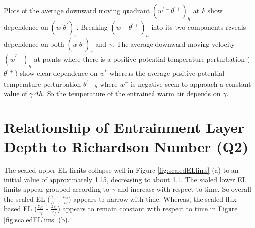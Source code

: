 Plots of the average downward moving quadrant $(\overline{w^{'-}\theta^{'+}})_{h}$ at $h$ show dependence on $(\overline{w^{'}\theta^{'}})_{s}$. Breaking $(\overline{w^{'-}\theta^{'+}})_{h}$ into its two components reveals dependence on both $(\overline{w^{'}\theta^{'}})_{s}$ and $\gamma$. The average downward moving velocity $(\overline{w^{'-}})_{h}$ at points where there is a positive potential temperature perturbation ($\theta^{'+}$) show clear dependence on $w^{*}$ whereas the average positive potential temperature perturbation $\overline{\theta^{'+}}_{h}$ where $w^{-}$ is negative seem to approach a constant value of $\gamma \Delta h$. So the temperature of the entrained warm air depends on $\gamma$.

\clearpage



\section{Relationship of Entrainment Layer Depth to Richardson Number (Q2)}
\label{sec:deltahri}
\FloatBarrier

The scaled upper \acs{EL} limits collapse well in Figure \ref{fig:scaledELlims} (a) 
to an initial value of approximately 1.15, decreasing to about 1.1.  The scaled lower \acs{EL} limits appear 
grouped according to $\gamma$ and increase with respect to time.  So overall the scaled \acs{EL} ($\frac{h_{1}}{h}$ - $\frac{h_{0}}{h}$) appears
to narrow with time.  Whereas, the scaled flux based \acs{EL} ($\frac{z_{f0}}{z_{f}}$ - $\frac{z_{f1}}{z_{f}}$) appears to remain constant 
with respect to time in Figure \ref{fig:scaledELlims} (b).\\

